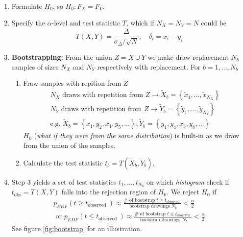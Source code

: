 \begin{enumerate}
    \item Formulate $H_0$, so $H_0: F_X = F_Y$.
    \item Specify the $\alpha$-level and test statistic $T$, which if $N_X = N_Y = N$ could be
    \begin{equation}
        T(X,Y) = \frac{\bar{\Delta}}{\sigma_\Delta \slash \sqrt{N}}, \quad \delta_i = x_i - y_i
    \end{equation}
    \item \textbf{Bootstrapping:} From the union $Z = X \cup Y$ we make draw replacement $N_b$ samples of sizes $N_X$ and $N_Y$ respectively with replacement. For $b = 1,\dots,N_b$
    \begin{enumerate}
        \item Fraw samples with repition from $Z$
        \begin{equation}
            \begin{gathered}
                N_X \text{ draws with repetition from } Z \rightarrow \tilde{X}_b=\left\{\tilde{x}_1, \ldots, \tilde{x}_{N_X}\right\} \\
                N_Y \text{ draws with repetition from } Z \rightarrow \tilde{Y}_b=\left\{\tilde{y}_1, \ldots, \tilde{y}_{N_Y}\right\} \\
                \text{e.g. } \tilde{X}_b=\left\{x_1, y_2, x_1, y_5, \ldots\right\}, \tilde{Y}_b=\left\{y_1, y_4, x_3, y_8, \ldots\right\}
            \end{gathered}
        \end{equation}
        $H_0$ (\textit{what if they were from the same distribution}) is built-in as we draw from the union of the samples.
        \item Calculate the test statistic $t_b = T(\tilde{X}_b,\tilde{Y}_b)$.
    \end{enumerate}
    \item Step 3 yields a set of test statistics $t_1,\dots,t_{N_b}$ on which \textit{histogram} check if $t_{\text{obs}} = T(X,Y)$ falls 
    into the rejection region of $H_0$. We reject $H_0$ if
    \begin{equation}
        \begin{gathered}
            p_{E D F}\left(t \geq t_{\text {observed }}\right) \approx \frac{\# \text { of bootstrap } t \geq t_{\text {observed }}}{\text { bootstrap drawings } N_b}<\frac{\alpha}{2} \\
            \text { or } p_{E D F}\left(t \leq t_{\text {observed }}\right) \approx \frac{\# \text { of bootstrap } t \leq t_{\text {observed }}}{\text { bootstrap drawings } N_b}<\frac{\alpha}{2}
        \end{gathered}
    \end{equation}
    See figure \ref{fig:bootstrap} for an illustration.
\end{enumerate}

